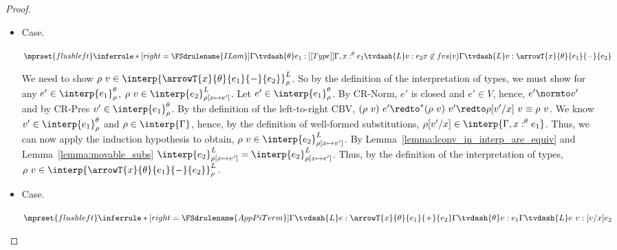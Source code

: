 \begin{proof}
\begin{itemize}
  \item[]Case.\ \\
    \begin{center}
      \begin{math}
        $$\mprset{flushleft}
        \inferrule* [right=\FSdrulename{ILam}] {
          \Gamma \tvdash{\theta} e_1:[[Type]]
          \\\\
          \Gamma,x:^\theta e_1 \tvdash{L} v:e_2
          \\\\
          x \not \in fvs(v)
        }{\Gamma \tvdash{L} v:\arrowT{x}{\theta}{e_1}{-}{e_2}}
      \end{math}
    \end{center}
    We need to show 
    $\rho\ v \in \interp{\arrowT{x}{\theta}{e_1}{-}{e_2}}^{L}_\rho$.  So by the
    definition of the interpretation of types, we must show for any
    $e' \in \interp{e_1}^\theta_\rho$, $\rho\ v \in
    \interp{e_2}^{L}_{\rho[x \mapsto e']}$.  Let $e' \in
    \interp{e_1}^\theta_\rho$.  By CR-Norm, $e'$ is closed and $e' \in V$,
    hence, $e' \normto v'$ and by CR-Pres $v' \in \interp{e_1}^\theta_\rho$.
    By the definition of the left-to-right CBV, 
    $(\rho\ v)\ e' \redto^* (\rho\ v)\ v' \redto \rho[v'/x]\ v \equiv \rho\ v$.  We
    know $v' \in \interp{e_1}^\theta_\rho$ and $\rho \in
    \interp{\Gamma}$, hence, by the definition of well-formed
    substitutions, $\rho[v'/x] \in \interp{\Gamma,x:^\theta e_1}$.  Thus, 
    we can now apply the induction hypothesis to obtain, $\rho\ v \in
    \interp{e_2}^L_{\rho[x \mapsto v']}$. By 
    Lemma~\ref{lemma:lconv_in_interp_are_equiv} and Lemma~\ref{lemma:movable_subs} 
    $\interp{e_2}^L_{\rho[x \mapsto v']} = \interp{e_2}^L_{\rho[x \mapsto e']}$.  
    Thus, by the definition of the interpretation of types, $\rho\ v \in
    \interp{\arrowT{x}{\theta}{e_1}{-}{e_2}}^{L}_\rho$.

  \item[]Case.\ \\
    \begin{center}
      \begin{math}
        $$\mprset{flushleft}
        \inferrule*[right=\FSdrulename{AppPiTerm}]{
          \Gamma \tvdash{L} e:\arrowT{x}{\theta}{e_1}{+}{e_2}
          \\\\
          \Gamma \tvdash{\theta} v:e_1
        }{\Gamma \tvdash{L} e\ v:[v/x]e_2}
      \end{math}
    \end{center}



\end{itemize}
\end{proof}
